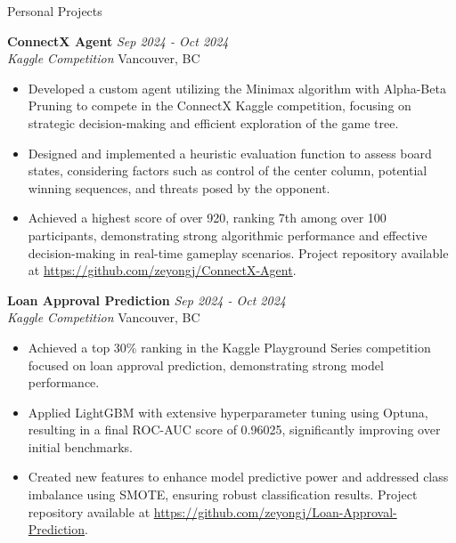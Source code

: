 \documentclass{resume} %
\begin{document}
\begin{rSection}{Personal Projects}

{\bf ConnectX Agent} \hfill {\em Sep 2024 - Oct 2024}
\\{\textit{Kaggle Competition} \hfill {Vancouver, BC}}
\begin{itemize}
    \vspace{-0.2cm}\item Developed a custom agent utilizing the Minimax algorithm with Alpha-Beta Pruning to compete in the ConnectX Kaggle competition, focusing on strategic decision-making and efficient exploration of the game tree.
    \vspace{-0.2cm}\item Designed and implemented a heuristic evaluation function to assess board states, considering factors such as control of the center column, potential winning sequences, and threats posed by the opponent.
    \vspace{-0.2cm}\item Achieved a highest score of over 920, ranking 7th among over 100 participants, demonstrating strong algorithmic performance and effective decision-making in real-time gameplay scenarios. Project repository available at \url{https://github.com/zeyongj/ConnectX-Agent}.
\end{itemize}

{\bf Loan Approval Prediction} \hfill {\em Sep 2024 - Oct 2024}
\\{\textit{Kaggle Competition} \hfill {Vancouver, BC}}
\begin{itemize}
    \vspace{-0.2cm}\item Achieved a top 30\% ranking in the Kaggle Playground Series competition focused on loan approval prediction, demonstrating strong model performance.
    \vspace{-0.2cm}\item Applied LightGBM with extensive hyperparameter tuning using Optuna, resulting in a final ROC-AUC score of 0.96025, significantly improving over initial benchmarks.
    \vspace{-0.2cm}\item Created new features to enhance model predictive power and addressed class imbalance using SMOTE, ensuring robust classification results. Project repository available at \url{https://github.com/zeyongj/Loan-Approval-Prediction}.
\end{itemize}




\end{rSection}
\end{document}
